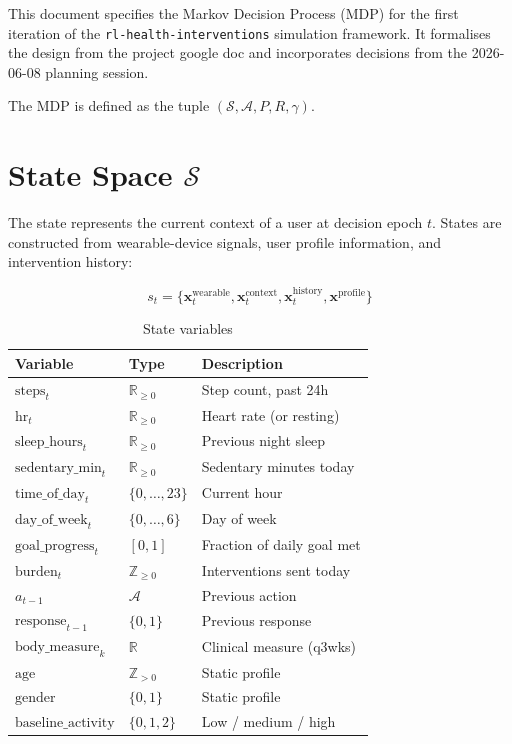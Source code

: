 \documentclass[11pt,a4paper]{article}
\begin{document}
This document specifies the Markov Decision Process (MDP) for the first iteration
of the \texttt{rl-health-interventions} simulation framework. It formalises the
design from the project google doc and incorporates decisions from the
2026-06-08 planning session.

The MDP is defined as the tuple $(\mathcal{S}, \mathcal{A}, P, R, \gamma)$.

\section{State Space $\mathcal{S}$}

The state represents the current context of a user at decision epoch $t$.
States are constructed from wearable-device signals, user profile information,
and intervention history:

\[
s_t = \{ \mathbf{x}_t^{\text{wearable}}, \mathbf{x}_t^{\text{context}},
\mathbf{x}_t^{\text{history}}, \mathbf{x}^{\text{profile}} \}
\]

\begin{table}[h]
\centering
\caption{State variables}
\begin{tabular}{lll}
\toprule
Variable & Type & Description \\
\midrule
$\text{steps}_t$ & $\mathbb{R}_{\geq 0}$ & Step count, past 24h \\
$\text{hr}_t$ & $\mathbb{R}_{\geq 0}$ & Heart rate (or resting) \\
$\text{sleep\_hours}_t$ & $\mathbb{R}_{\geq 0}$ & Previous night sleep \\
$\text{sedentary\_min}_t$ & $\mathbb{R}_{\geq 0}$ & Sedentary minutes today \\
$\text{time\_of\_day}_t$ & $\{0,\dots,23\}$ & Current hour \\
$\text{day\_of\_week}_t$ & $\{0,\dots,6\}$ & Day of week \\
$\text{goal\_progress}_t$ & $[0,1]$ & Fraction of daily goal met \\
$\text{burden}_t$ & $\mathbb{Z}_{\geq 0}$ & Interventions sent today \\
$a_{t-1}$ & $\mathcal{A}$ & Previous action \\
$\text{response}_{t-1}$ & $\{0,1\}$ & Previous response \\
$\text{body\_measure}_k$ & $\mathbb{R}$ & Clinical measure (q3wks) \\
$\text{age}$ & $\mathbb{Z}_{>0}$ & Static profile \\
$\text{gender}$ & $\{0,1\}$ & Static profile \\
$\text{baseline\_activity}$ & $\{0,1,2\}$ & Low / medium / high \\
\bottomrule
\end{tabular}
\end{table}
\end{document}
